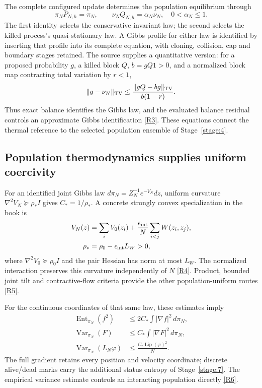 \documentclass[11pt,a4paper]{article}
\newcommand{\Ent}{\operatorname{Ent}}
\newcommand{\Var}{\operatorname{Var}}
\begin{document}
The complete configured update determines the population equilibrium through
\[
\pi_NP_{N,h}=\pi_N,
\qquad
\nu_NQ_{N,h}=\alpha_N\nu_N,
\quad 0<\alpha_N\le1.
\]
The first identity selects the conservative invariant law; the second selects the killed process's quasi-stationary law. A Gibbs profile for either law is identified by inserting that profile into its complete equation, with cloning, collision, cap and boundary stages retained. The source supplies a quantitative version: for a proposed probability \(g\), a killed block \(Q\), \(b=gQ1>0\), and a normalized block map contracting total variation by \(r<1\),
\[
\|g-\nu_N\|_{\rm TV}
\le\frac{\|gQ-bg\|_{\rm TV}}{b(1-r)}.
\]
Thus exact balance identifies the Gibbs law, and the evaluated balance residual controls an approximate Gibbs identification \hyperref[src:thm-qsd-gibbs]{[R3]}. These equations connect the thermal reference to the selected population ensemble of Stage~\ref{stage:4}.

\subsection*{Population thermodynamics supplies uniform coercivity}
For an identified joint Gibbs law \(d\pi_N=Z_N^{-1}e^{-V_N}dz\), uniform curvature \(\nabla^2V_N\succeq\rho_*I\) gives \(C_*=1/\rho_*\). A concrete strongly convex specialization in the book is
\begin{align*}
V_N(z)&=\sum_iV_0(z_i)
 +\frac{\epsilon_{\rm int}}{N}\sum_{i<j}W(z_i,z_j),\\
\rho_*&=\rho_0-\epsilon_{\rm int}L_W>0,
\end{align*}
where \(\nabla^2V_0\succeq\rho_0I\) and the pair Hessian has norm at most \(L_W\). The normalized interaction preserves this curvature independently of \(N\) \hyperref[src:prop-kl-joint-interaction-curvature]{[R4]}. Product, bounded joint tilt and contractive-flow criteria provide the other population-uniform routes \hyperref[src:cor-n-uniform-lsi]{[R5]}.

For the continuous coordinates of that same law, these estimates imply
\begin{align*}
\Ent_{\pi_N}(f^2)&\le2C_*\int|\nabla f|^2\,d\pi_N,\\
\Var_{\pi_N}(F)&\le C_*\int|\nabla F|^2\,d\pi_N,\\
\Var_{\pi_N}(L_N\varphi)&\le
 \frac{C_*\operatorname{Lip}(\varphi)^2}{N}.
\end{align*}
The full gradient retains every position and velocity coordinate; discrete alive/dead marks carry the additional status entropy of Stage~\ref{stage:7}. The empirical variance estimate controls an interacting population directly \hyperref[src:cor-quantitative-lsi-final]{[R6]}.
\end{document}
